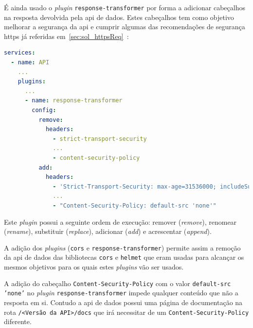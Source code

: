 É ainda usado o \textit{plugin} \texttt{response-transformer} por forma a adicionar cabeçalhos na resposta devolvida pela \acrshort{api} de dados. Estes cabeçalhos tem como objetivo melhorar a segurança da \acrshort{api} e cumprir algumas das recomendações de segurança \acrshort{https} já referidas em~\ref{sec:sol_httpsReq}~\cite{kongResponseTransformer}:
\begin{lstlisting}[language=yaml, caption=Configuração declarativa do \textit{Kong}: \textit{plugin} \texttt{response-transformer}]
services:
  - name: API
    ...
    plugins:
      ...
      - name: response-transformer
        config:
          remove:
            headers:
              - strict-transport-security
              ...
              - content-security-policy
          add:
            headers:
              - 'Strict-Transport-Security: max-age=31536000; includeSubDomains; preload'
              ...
              - "Content-Security-Policy: default-src 'none'"
\end{lstlisting}

Este \textit{plugin} possui a seguinte ordem de execução: remover (\textit{remove}), renomear (\textit{rename}), substituir (\textit{replace}), adicionar (\textit{add}) e acrescentar (\textit{append}).

A adição dos \textit{plugins} (\texttt{cors} e \texttt{response-transformer}) permite assim a remoção da \acrshort{api} de dados das bibliotecas \texttt{cors} e \texttt{helmet} que eram usadas para alcançar os mesmos objetivos para os quais estes \textit{plugins} vão ser usados.

A adição do cabeçalho \texttt{Content-Security-Policy} com o valor \texttt{default-src 'none'} no \textit{plugin} \texttt{response-transformer} impede qualquer conteúdo que não a resposta em si. Contudo a \acrshort{api} de dados possui uma página de documentação na rota \texttt{/<Versão da API>/docs} que irá necessitar de um \texttt{Content-Security-Policy} diferente. 

